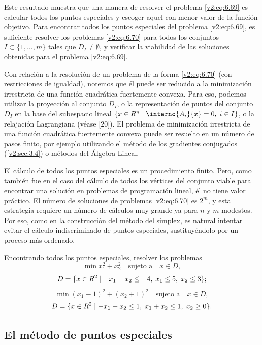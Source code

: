 Este resultado muestra que una manera de resolver el problema \eqref{v2:eq:6.69} es calcular todos los puntos especiales y escoger aquel con menor valor de la función objetivo. Para encontrar todos los puntos especiales del problema \eqref{v2:eq:6.69}, es suficiente resolver los problemas \eqref{v2:eq:6.70} para todos los conjuntos $I \subset \{1, \dots, m\}$ tales que $D_I \neq \emptyset$, y verificar la viabilidad de las soluciones obtenidas para el problema \eqref{v2:eq:6.69}.

Con relación a la resolución de un problema de la forma \eqref{v2:eq:6.70} (con restricciones de igualdad), notemos que él puede ser reducido a la minimización irrestricta de una función cuadrática fuertemente convexa. Para eso, podemos utilizar la proyección al conjunto $D_I$, o la representación de puntos del conjunto $D_I$ en la base del subespacio lineal $\{ x \in \Rn \mid \interno{A_i}{x} = 0, \; i \in I \}$, o la relajación Lagrangiana (véase [20]). El problema de minimización irrestricta de una función cuadrática fuertemente convexa puede ser resuelto en un número de pasos finito, por ejemplo utilizando el método de los gradientes conjugados (\cref{v2:sec:3.4}) o métodos del Álgebra Lineal.

El cálculo de todos los puntos especiales es un procedimiento finito. Pero, como también fue en el caso del cálculo de todos los vértices del conjunto viable para encontrar una solución en problemas de programación lineal, él no tiene valor práctico. El número de soluciones de problemas \eqref{v2:eq:6.70} es $2^m$, y esta estrategia requiere un número de cálculos muy grande ya para $n$ y $m$ modestos. Por eso, como en la construcción del método del simplex, es natural intentar evitar el cálculo indiscriminado de puntos especiales, sustituyéndolo por un proceso más ordenado.

\begin{exercise}\label{v2:ejer:6.2.1}
    Encontrando todos los puntos especiales, resolver los problemas
    \[
        \min x_1^2 + x_2^2 \quad \text{sujeto a} \quad x \in D,
    \]
    \[
        D = \{ x \in R^2 \mid -x_1 - x_2 \le -4, \; x_1 \le 5, \; x_2 \le 3 \};
    \]
    \[
        \min (x_1 - 1)^2 + (x_2 + 1)^2 \quad \text{sujeto a} \quad x \in D,
    \]
    \[
        D = \{ x \in R^2 \mid -x_1 + x_2 \le 1, \; x_1 + x_2 \le 1, \; x_2 \ge 0 \}.
    \]
\end{exercise}

\subsection{El método de puntos especiales}
\label{v2:sec:6.2.2}

